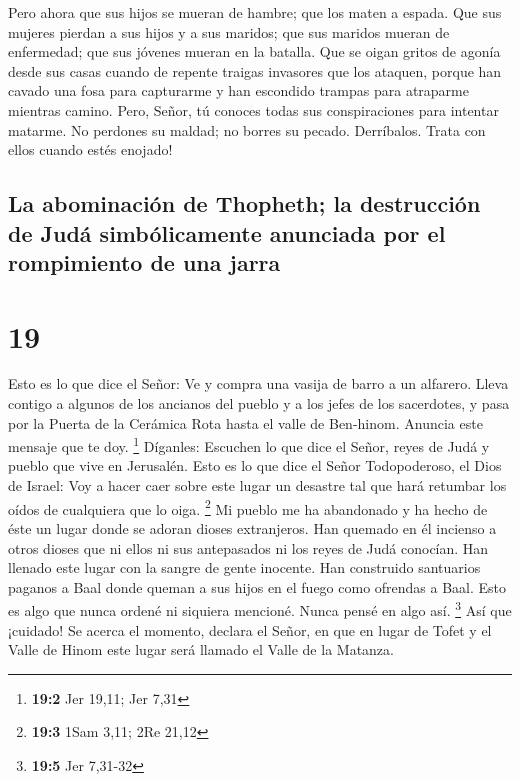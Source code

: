  Pero ahora que sus hijos se mueran de hambre; que los
maten a espada. Que sus mujeres pierdan a sus hijos y a sus maridos; que
sus maridos mueran de enfermedad; que sus jóvenes mueran en la batalla.
 Que se oigan gritos de agonía desde sus casas cuando de
repente traigas invasores que los ataquen, porque han cavado una fosa
para capturarme y han escondido trampas para atraparme mientras camino.
 Pero, Señor, tú conoces todas sus conspiraciones para
intentar matarme. No perdones su maldad; no borres su pecado.
Derríbalos. Trata con ellos cuando estés enojado!

\hypertarget{la-abominaciuxf3n-de-thopheth-la-destrucciuxf3n-de-juduxe1-simbuxf3licamente-anunciada-por-el-rompimiento-de-una-jarra}{%
\subsection{La abominación de Thopheth; la destrucción de Judá
simbólicamente anunciada por el rompimiento de una
jarra}\label{la-abominaciuxf3n-de-thopheth-la-destrucciuxf3n-de-juduxe1-simbuxf3licamente-anunciada-por-el-rompimiento-de-una-jarra}}

\hypertarget{section-18}{%
\section{19}\label{section-18}}

 Esto es lo que dice el Señor: Ve y compra una vasija de
barro a un alfarero. Lleva contigo a algunos de los ancianos del pueblo
y a los jefes de los sacerdotes,  y pasa por la Puerta de
la Cerámica Rota hasta el valle de Ben-hinom. Anuncia este mensaje que
te doy. \footnote{\textbf{19:2} Jer 19,11; Jer 7,31} 
Díganles: Escuchen lo que dice el Señor, reyes de Judá y pueblo que vive
en Jerusalén. Esto es lo que dice el Señor Todopoderoso, el Dios de
Israel: Voy a hacer caer sobre este lugar un desastre tal que hará
retumbar los oídos de cualquiera que lo oiga. \footnote{\textbf{19:3}
  1Sam 3,11; 2Re 21,12}  Mi pueblo me ha abandonado y ha
hecho de éste un lugar donde se adoran dioses extranjeros. Han quemado
en él incienso a otros dioses que ni ellos ni sus antepasados ni los
reyes de Judá conocían. Han llenado este lugar con la sangre de gente
inocente.  Han construido santuarios paganos a Baal donde
queman a sus hijos en el fuego como ofrendas a Baal. Esto es algo que
nunca ordené ni siquiera mencioné. Nunca pensé en algo así. \footnote{\textbf{19:5}
  Jer 7,31-32}  Así que ¡cuidado! Se acerca el momento,
declara el Señor, en que en lugar de Tofet y el Valle de Hinom este
lugar será llamado el Valle de la Matanza.

